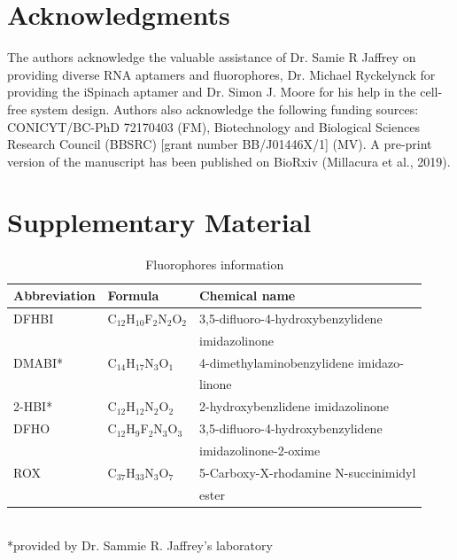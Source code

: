 \section{Acknowledgments}

  
The authors acknowledge the valuable assistance of Dr. Samie R Jaffrey on providing diverse RNA aptamers and fluorophores, Dr. Michael Ryckelynck for providing the iSpinach aptamer and Dr. Simon J. Moore for his help in the cell-free system design. Authors also acknowledge the following funding sources: CONICYT/BC-PhD 72170403 (FM), Biotechnology and Biological Sciences Research Council (BBSRC) [grant number BB/J01446X/1] (MV). A pre-print version of the manuscript has been published on BioRxiv (Millacura et al., 2019).

\section{Supplementary Material}


\begin{table}[ht]
\caption{Fluorophores information\\}
\label{table:32}%
{%
\begin{tabular*}{\columnwidth}{@{}lll@{}}
\hline
Abbreviation & Formula & Chemical name 
\\
\hline
DFHBI & C$_{12}$H$_{10}$F$_{2}$N$_{2}$O$_{2}$ &  3,5-difluoro-4-hydroxybenzylidene 
\\
& &  imidazolinone
\\
DMABI* & C$_{14}$H$_{17}$N$_{3}$O$_{1}$ & 4-dimethylaminobenzylidene imidazo-
\\
&  & linone
\\
2-HBI* & C$_{12}$H$_{12}$N$_{2}$O$_{2}$ &  2-hydroxybenzlidene imidazolinone  
\\
DFHO & C$_{12}$H$_{9}$F$_{2}$N$_{3}$O$_{3}$ & 3,5-difluoro-4-hydroxybenzylidene 
\\
&  & imidazolinone-2-oxime
\\
ROX & C$_{37}$H$_{33}$N$_{3}$O$_{7}$ & 5-Carboxy-X-rhodamine N-succinimidyl  
\\
&  & ester
\\
\hline
\hline
\end{tabular*}
}
\\
{\footnotesize{*provided by Dr. Sammie R. Jaffrey's laboratory}}
\end{table}

